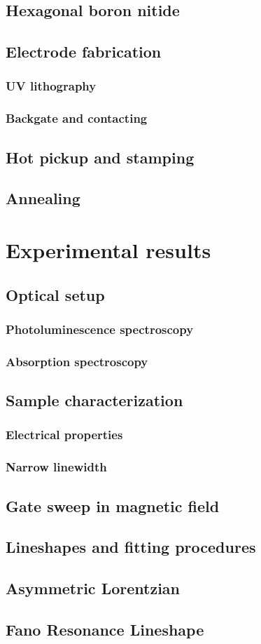 \documentclass{scrbook}
\begin{document}
	\section{Hexagonal boron nitide}
	\section{Electrode fabrication}
		\subsection{UV lithography}
		\subsection{Backgate and contacting}
	\section{Hot pickup and stamping}
	\section{Annealing}
\chapter{Experimental results}
	\section{Optical setup}
		\subsection{Photoluminescence spectroscopy}
		\subsection{Absorption spectroscopy}
	\section{Sample characterization}
		\subsection{Electrical properties}
		\subsection{Narrow linewidth}
	\section{Gate sweep in magnetic field}

\begin{appendices}
\chapter{Lineshapes and fitting procedures}
	\section{Asymmetric Lorentzian}
	\section{Fano Resonance Lineshape}
\end{appendices}
\end{document}
